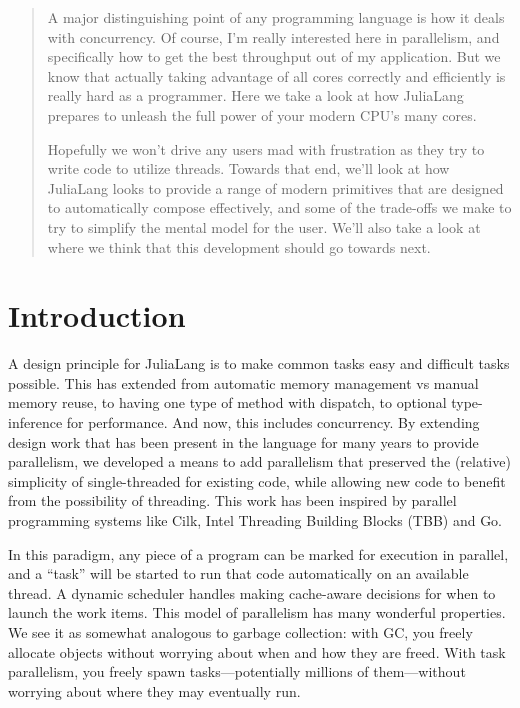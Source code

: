 \documentclass{juliacon}
\begin{document}


\maketitle

\begin{abstract}

A major distinguishing point of any programming language is how it deals with concurrency. Of course, I'm really interested here in parallelism, and specifically how to get the best throughput out of my application. But we know that actually taking advantage of all cores correctly and efficiently is really hard as a programmer. Here we take a look at how JuliaLang prepares to unleash the full power of your modern CPU's many cores.

Hopefully we won't drive any users mad with frustration as they try to write code to utilize threads. Towards that end, we'll look at how JuliaLang looks to provide a range of modern primitives that are designed to automatically compose effectively, and some of the trade-offs we make to try to simplify the mental model for the user. We'll also take a look at where we think that this development should go towards next.


\end{abstract}

\section{Introduction}
\label{subsub:intro}

A design principle for JuliaLang is to make common tasks easy and difficult tasks possible. This has extended from automatic memory management vs manual memory reuse, to having one type of method with dispatch, to optional type-inference for performance. And now, this includes concurrency. By extending design work that has been present in the language for many years to provide parallelism, we developed a means to add parallelism that preserved the (relative) simplicity of single-threaded for existing code, while allowing new code to benefit from the possibility of threading. This work has been inspired by parallel programming systems like Cilk, Intel Threading Building Blocks (TBB) and Go.

In this paradigm, any piece of a program can be marked for execution in parallel, and a “task” will be started to run that code automatically on an available thread. A dynamic scheduler handles making cache-aware decisions for when to launch the work items. This model of parallelism has many wonderful properties. We see it as somewhat analogous to garbage collection: with GC, you freely allocate objects without worrying about when and how they are freed. With task parallelism, you freely spawn tasks—potentially millions of them—without worrying about where they may eventually run.
\end{document}
